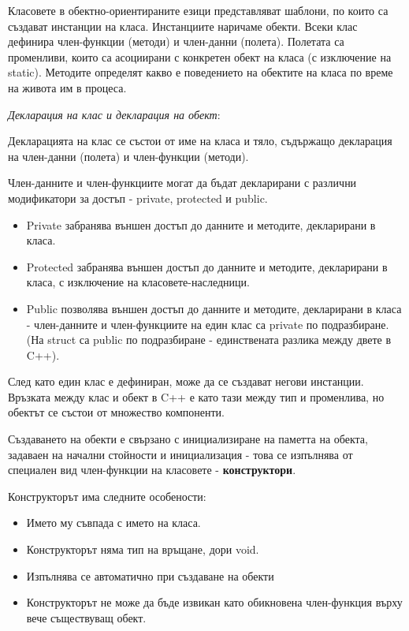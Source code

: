 \documentclass{article}
\renewcommand{\\}{\newline}
\begin{document}
Класовете в обектно-ориентираните езици представляват шаблони, по които са създават инстанции на класа. Инстанциите наричаме обекти. Всеки клас дефинира член-функции (методи) и член-данни (полета). Полетата са променливи, които са асоциирани с конкретен обект на класа (с изключение на static). Методите определят какво е поведението на обектите на класа по време на живота им в процеса.

\textit{Декларация на клас и декларация на обект}: 

Декларацията на клас се състои от име на класа и тяло, съдържащо декларация на член-данни (полета) и член-функции (методи). 

Член-данните и член-функциите могат да бъдат декларирани с различни модификатори за достъп - private, protected и public. 
\begin{itemize}
    \item Private забранява външен достъп до данните и методите, декларирани в класа.
    \item Protected забранява външен достъп до данните и методите, декларирани в класа, с изключение на класовете-наследници.
    \item Public позволява външен достъп до данните и  методите, декларирани в класа - член-данните и член-функциите на един клас са private по подразбиране. (На struct са public по подразбиране - единствената разлика между двете в C++).
\end{itemize}

След като един клас е дефиниран, може да се създават негови инстанции. Връзката между клас и обект в C++ е като тази между тип и променлива, но обектът се състои от множество компоненти. 

Създаването на обекти е свързано с инициализиране на паметта на обекта, задаваен на начални стойности и инициализация - това се изпълнява от специален вид член-функции на класовете - \textbf{конструктори}.

Конструкторът има следните особености:
\begin{itemize}
    \item Името му съвпада с името на класа.
    \item Конструкторът няма тип на връщане, дори void.
    \item Изпълнява се автоматично при създаване на обекти
    \item Конструкторът не може да бъде извикан като обикновена член-функция върху вече съществуващ обект.
  \end{itemize}
\end{document}
